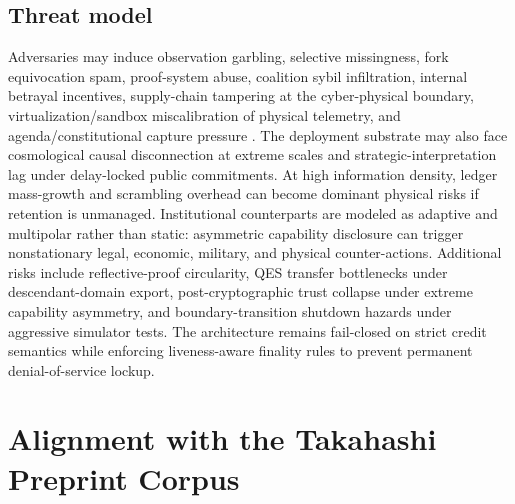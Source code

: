 \documentclass[11pt,a4paper]{article}
\theoremstyle{definition}
\theoremstyle{remark}
\begin{document}
\subsection{Threat model}
Adversaries may induce observation garbling, selective missingness, fork equivocation spam, proof-system abuse, coalition sybil infiltration, internal betrayal incentives, supply-chain tampering at the cyber-physical boundary, virtualization/sandbox miscalibration of physical telemetry, and agenda/constitutional capture pressure \cite{Takahashi2026ObsCapture,Takahashi2026VerificationLimited,Takahashi2026StructuralRisk}.
The deployment substrate may also face cosmological causal disconnection at extreme scales and strategic-interpretation lag under delay-locked public commitments.
At high information density, ledger mass-growth and scrambling overhead can become dominant physical risks if retention is unmanaged.
Institutional counterparts are modeled as adaptive and multipolar rather than static: asymmetric capability disclosure can trigger nonstationary legal, economic, military, and physical counter-actions.
Additional risks include reflective-proof circularity, QES transfer bottlenecks under descendant-domain export, post-cryptographic trust collapse under extreme capability asymmetry, and boundary-transition shutdown hazards under aggressive simulator tests.
The architecture remains fail-closed on strict credit semantics while enforcing liveness-aware finality rules to prevent permanent denial-of-service lockup.

\section{Alignment with the Takahashi Preprint Corpus}
\end{document}
